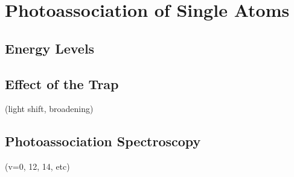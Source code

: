 
\chapter{Photoassociation of Single Atoms}
\label{ch:pa}

\section{Energy Levels}

\section{Effect of the Trap}

(light shift, broadening)

\section{Photoassociation Spectroscopy}
(v=0, 12, 14, etc)
